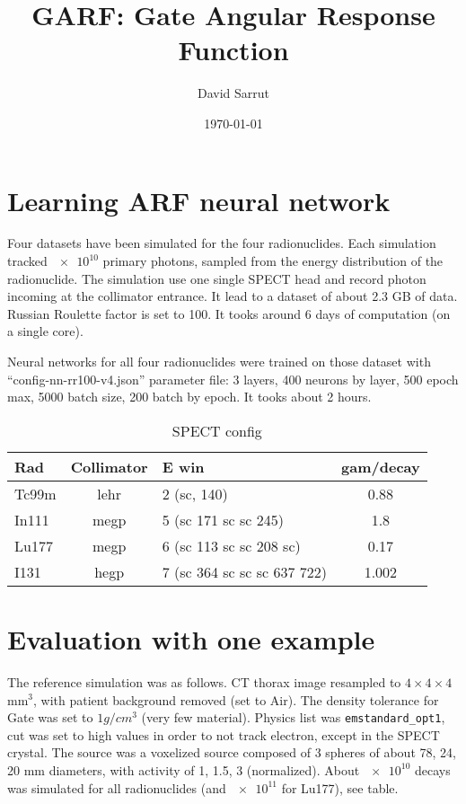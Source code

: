\documentclass[11pt,final,a4paper]{article}
\begin{document}
\thispagestyle{fancy}

\title{GARF: Gate Angular Response Function}
\author{David Sarrut}
\date{\today}

\maketitle

\section{Learning ARF neural network}

Four datasets have been simulated for the four radionuclides. Each
simulation tracked $\num{e10}$ primary photons, sampled from the
energy distribution of the radionuclide. The simulation use one single
SPECT head and record photon incoming at the collimator entrance. It
lead to a dataset of about 2.3 GB of data. Russian Roulette factor is
set to 100. It tooks around 6 days of computation (on a single core).


Neural networks for all four radionuclides were trained on those
dataset with ``config-nn-rr100-v4.json'' parameter file: 3 layers, 400
neurons by layer, 500 epoch max, 5000 batch size, 200 batch by
epoch. It tooks about 2 hours.

\begin{table}[htbp]
  \centering
  \begin{tabular}[htbp]{lclc}
    Rad & Collimator & E win & gam/decay \\\hline
    Tc99m & lehr & 2 (sc, 140) & 0.88 \\
    In111 & megp & 5 (sc 171 sc sc 245) &  1.8 \\
    Lu177 & megp & 6 (sc 113 sc sc 208 sc) & 0.17 \\
    I131 & hegp & 7 (sc 364 sc sc sc 637 722) & 1.002 \\
  \end{tabular}
  \caption{SPECT config}
  \label{tab:spect}  
\end{table}

\section{Evaluation with one example}

The reference simulation was as follows. CT thorax image resampled to
$4 \times 4 \times 4$ mm$^3$, with patient background removed (set to
Air). The density tolerance for Gate was set to $1 g/cm^3$ (very few
material). Physics list was \verb+emstandard_opt1+, cut was set to high
values in order to not track electron, except in the SPECT
crystal. The source was a voxelized source composed of 3 spheres of
about 78, 24, 20 mm diameters, with activity of 1, 1.5, 3
(normalized). About $\num{e10}$ decays was simulated for all
radionuclides (and $\num{e11}$ for Lu177), see table.
\end{document}
